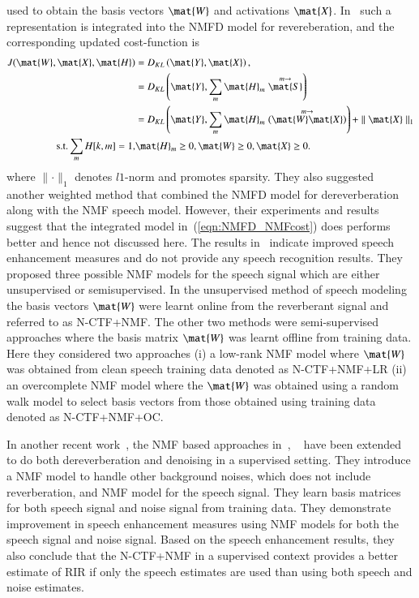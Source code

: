 used to obtain the basis vectors $\mat{W}$ and activations $\mat{X}$.
In~\cite{Mohammadiha2016} such a representation is integrated into the NMFD
model for revereberation, and the corresponding updated cost-function is
\begin{align}
  J(\mat{W}, \mat{X},\mat{H}) &= D_{KL}\left(\mat{Y}, \mat{X}\right),\\
  &= D_{KL}\left(\mat{Y}, \sum_{m} \mat{H}_m
  \stackrel{m\rightarrow}{\mat{S}}\right)\\
  &= D_{KL}\left(\mat{Y}, \sum_m \mat{H}_m \stackrel{m \rightarrow}{\left(\mat{W}
  \mat{X}\right)}\right)
  + \parallel \mat{X} \parallel_1 \\
  \text{s.t.}  \sum_m H[k,m] = 1,& \mat{H}_m \ge 0, \mat{W} \ge 0, \mat{X} \ge 0.
  \label{eqn:NMFD_NMFcost}
\end{align}
where $\parallel \cdot \parallel_1$ denotes $l1$-norm and promotes sparsity.
They also suggested another weighted method that combined the NMFD model for
dereverberation along with the NMF speech model. However, their experiments and
results suggest that the integrated model in~(\ref{eqn:NMFD_NMFcost}) does performs
better and hence not discussed here. The results in~\cite{Mohammadiha2016}
indicate improved speech enhancement measures and do not provide any speech
recognition results. They proposed three possible NMF models for the speech
signal which are either unsupervised or semisupervised. In the unsupervised
method of speech modeling the basis vectors $\mat{W}$ were learnt online from
the reverberant signal and referred to as N-CTF+NMF. The other two methods were
semi-supervised approaches where the basis matrix $\mat{W}$ was learnt offline
from training data. Here they considered two approaches (i) a low-rank NMF model
where $\mat{W}$ was obtained from clean speech training data denoted as
N-CTF+NMF+LR 
(ii) an overcomplete NMF model where the $\mat{W}$ was obtained using a random
walk model to select basis vectors from those obtained using training data denoted as N-CTF+NMF+OC.

In another recent work~\cite{baby2016supervised}, the NMF based approaches
in~\cite{Mohammadiha2016}, ~\cite{kameoka2009robust} have been extended to do both
dereverberation and denoising in a supervised setting. They introduce a NMF model to handle other
background noises, which does not include reverberation, and NMF model for the
speech signal. They learn basis matrices for both speech signal and noise signal
from training data. They demonstrate improvement in speech enhancement measures
using NMF models for both the speech signal and noise signal. Based on the
speech enhancement results, they also conclude that the N-CTF+NMF in a
supervised context provides a better estimate of RIR if only the speech
estimates are used than using both speech and noise estimates. 


